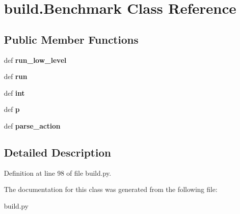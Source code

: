 \hypertarget{classbuild_1_1Benchmark}{\section{build.\-Benchmark \-Class \-Reference}
\label{classbuild_1_1Benchmark}
}
\subsection*{\-Public \-Member \-Functions}
\begin{DoxyCompactItemize}
\item 
\hypertarget{classbuild_1_1Benchmark_aa83f3c52517967b7aaeb6ea896f03feb}{def {\bfseries run\-\_\-low\-\_\-level}}\label{classbuild_1_1Benchmark_aa83f3c52517967b7aaeb6ea896f03feb}

\item 
\hypertarget{classbuild_1_1Benchmark_aaa6c3e07a5f9853f9efa2b8057a1346d}{def {\bfseries run}}\label{classbuild_1_1Benchmark_aaa6c3e07a5f9853f9efa2b8057a1346d}

\item 
\hypertarget{classbuild_1_1Benchmark_a519134bd27acbd705050c16f593bfa82}{def {\bfseries int}}\label{classbuild_1_1Benchmark_a519134bd27acbd705050c16f593bfa82}

\item 
\hypertarget{classbuild_1_1Benchmark_a184359333daaa47e8d2dd22d8065b233}{def {\bfseries p}}\label{classbuild_1_1Benchmark_a184359333daaa47e8d2dd22d8065b233}

\item 
\hypertarget{classbuild_1_1Benchmark_a5b7c8ca2109cdd060640d95f7dab7209}{def {\bfseries parse\-\_\-action}}\label{classbuild_1_1Benchmark_a5b7c8ca2109cdd060640d95f7dab7209}

\end{DoxyCompactItemize}


\subsection{\-Detailed \-Description}


\-Definition at line 98 of file build.\-py.



\-The documentation for this class was generated from the following file\-:\begin{DoxyCompactItemize}
\item 
build.\-py\end{DoxyCompactItemize}
